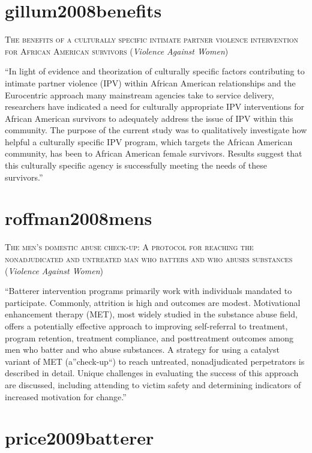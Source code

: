 \documentclass[]{tufte-handout}
\begin{document}
\section{\texorpdfstring{\textcolor[HTML]{5b0057}{gillum2008benefits}}{}}\label{section-11}

\textsc{\large{The benefits of a culturally specific intimate partner violence intervention for African American survivors}}
(\emph{Violence Against Women})

``In light of evidence and theorization of culturally specific factors
contributing to intimate partner violence (IPV) within African American
relationships and the Eurocentric approach many mainstream agencies take
to service delivery, researchers have indicated a need for culturally
appropriate IPV interventions for African American survivors to
adequately address the issue of IPV within this community. The purpose
of the current study was to qualitatively investigate how helpful a
culturally specific IPV program, which targets the African American
community, has been to African American female survivors. Results
suggest that this culturally specific agency is successfully meeting the
needs of these survivors.''

\section{\texorpdfstring{\textcolor[HTML]{5b0057}{roffman2008mens}}{}}\label{section-12}

\textsc{\large{The men's domestic abuse check-up: A protocol for reaching the nonadjudicated and untreated man who batters and who abuses substances}}
(\emph{Violence Against Women})

``Batterer intervention programs primarily work with individuals
mandated to participate. Commonly, attrition is high and outcomes are
modest. Motivational enhancement therapy (MET), most widely studied in
the substance abuse field, offers a potentially effective approach to
improving self-referral to treatment, program retention, treatment
compliance, and posttreatment outcomes among men who batter and who
abuse substances. A strategy for using a catalyst variant of MET
(a''check-up``) to reach untreated, nonadjudicated perpetrators is
described in detail. Unique challenges in evaluating the success of this
approach are discussed, including attending to victim safety and
determining indicators of increased motivation for change.''

\section{\texorpdfstring{\textcolor[HTML]{5b0057}{price2009batterer}}{}}\label{section-13}
\end{document}
